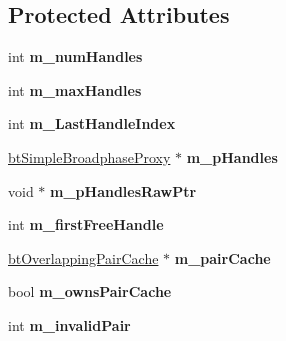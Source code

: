 \subsection*{Protected Attributes}
\begin{DoxyCompactItemize}
\item 
\mbox{\label{classbtSimpleBroadphase_abe4387e2ff185215472a0ef4dbf8c310}} 
int {\bfseries m\+\_\+num\+Handles}
\item 
\mbox{\label{classbtSimpleBroadphase_a409bfa4f15cf3f1a754c0e241cfb4dbe}} 
int {\bfseries m\+\_\+max\+Handles}
\item 
\mbox{\label{classbtSimpleBroadphase_ab0a2c912630a5b9797177bdb38617f7a}} 
int {\bfseries m\+\_\+\+Last\+Handle\+Index}
\item 
\mbox{\label{classbtSimpleBroadphase_a22c0bdee8fb72fcd0399eaac47f922f1}} 
\hyperlink{structbtSimpleBroadphaseProxy}{bt\+Simple\+Broadphase\+Proxy} $\ast$ {\bfseries m\+\_\+p\+Handles}
\item 
\mbox{\label{classbtSimpleBroadphase_ae3a2d22fc522e71760d00c1dc861ed32}} 
void $\ast$ {\bfseries m\+\_\+p\+Handles\+Raw\+Ptr}
\item 
\mbox{\label{classbtSimpleBroadphase_a6fcaab4932baf665a5007e61ee0b0f60}} 
int {\bfseries m\+\_\+first\+Free\+Handle}
\item 
\mbox{\label{classbtSimpleBroadphase_a0a022c107f3ea958a0a3b27748b9f2a8}} 
\hyperlink{classbtOverlappingPairCache}{bt\+Overlapping\+Pair\+Cache} $\ast$ {\bfseries m\+\_\+pair\+Cache}
\item 
\mbox{\label{classbtSimpleBroadphase_a37e38cdd49afbb2f06af879dc28cf418}} 
bool {\bfseries m\+\_\+owns\+Pair\+Cache}
\item 
\mbox{\label{classbtSimpleBroadphase_a6c7cf01dfa209f2ec041a0d625f4226d}} 
int {\bfseries m\+\_\+invalid\+Pair}
\end{DoxyCompactItemize}


